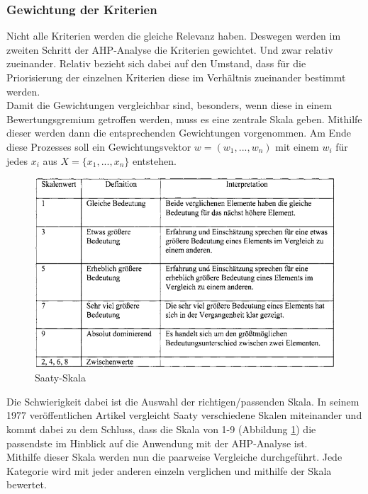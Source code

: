\subsubsection{Gewichtung der Kriterien}
Nicht alle Kriterien werden die gleiche Relevanz haben. Deswegen werden im zweiten Schritt der AHP-Analyse die Kriterien gewichtet.\autocite[Vgl.][S.9]{Mu.2018} Und zwar relativ zueinander. Relativ bezieht sich dabei auf den Umstand, dass für die Priorisierung der einzelnen Kriterien diese im Verhältnis zueinander bestimmt werden. \\
Damit die Gewichtungen vergleichbar sind, besonders, wenn diese in einem Bewertungsgremium getroffen werden, muss es eine zentrale Skala geben. Mithilfe dieser werden dann die entsprechenden Gewichtungen vorgenommen. Am Ende diese Prozesses soll ein Gewichtungsvektor $w=(w_{1}, ..., w_{n})$ mit einem $w_i$ für jedes $x_i$ aus $X=\{x_{1}, ..., x_{n}\}$ entstehen\autocite[Vgl.][S.4]{Brunelli.2015}. \\
\begin{figure}[h!]
	\centering
	\includegraphics[scale = 0.8]{img/Skala.png}
	\caption{Saaty-Skala}
	\label{img:scale}
\end{figure}
Die Schwierigkeit dabei ist die Auswahl der richtigen/passenden Skala. In seinem 1977 veröffentlichen Artikel\autocite{Saaty.1977} vergleicht Saaty verschiedene Skalen miteinander und kommt dabei zu dem Schluss, dass die Skala von 1-9 (Abbildung \ref{img:scale}) die passendste im Hinblick auf die Anwendung mit der AHP-Analyse ist. \\
Mithilfe dieser Skala werden nun die paarweise Vergleiche durchgeführt. Jede Kategorie wird mit jeder anderen einzeln verglichen und mithilfe der Skala bewertet.\autocite[Vgl.][S.106]{Fink.2006}  
